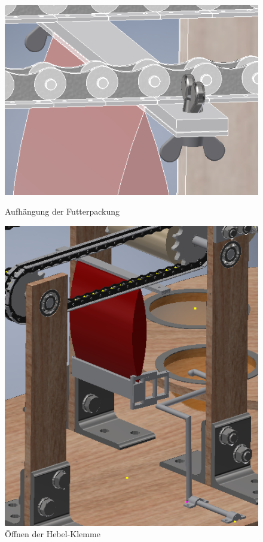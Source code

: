 \begin{figure}[H]
   \begin{minipage}[hbt]{.4\linewidth} %
      \includegraphics[width=\linewidth]{Bilder/Inventor/Fluegelmutter_Ansicht}
      \caption{Aufhängung der Futterpackung}
      \label{Futterpackung_Aufhaengung_Inventor} 
   \end{minipage}
   \hspace{.1\linewidth}%
   \begin{minipage}[hbt]{.4\linewidth} %
      \includegraphics[width=\linewidth]{Bilder/Inventor/Futterpackung_Ansicht}
      \caption{Öffnen der Hebel-Klemme}
      \label{Oeffnen_Futterpackung_Inventor}
   \end{minipage}
\end{figure}


